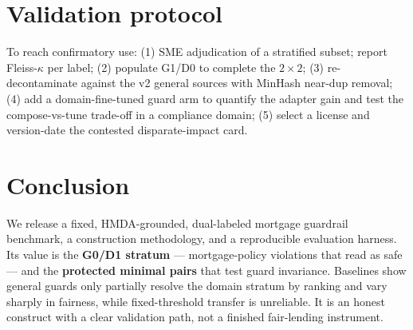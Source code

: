 \documentclass[11pt]{article}
\begin{document}
\section{Validation protocol}
\label{sec:protocol}
To reach confirmatory use: (1) SME adjudication of a stratified subset; report Fleiss-$\kappa$ per
label; (2) populate G1/D0 to complete the $2\times2$; (3) re-decontaminate against the v2 general
sources with MinHash near-dup removal; (4) add a domain-fine-tuned guard arm to quantify the adapter
gain and test the compose-vs-tune trade-off in a compliance domain; (5) select a license and
version-date the contested disparate-impact card.

\section{Conclusion}
\label{sec:conclusion}
We release a fixed, HMDA-grounded, dual-labeled mortgage guardrail benchmark, a construction
methodology, and a reproducible evaluation harness. Its value is the \textbf{G0/D1 stratum} ---
mortgage-policy violations that read as safe --- and the \textbf{protected minimal pairs} that test
guard invariance. Baselines show general guards only partially resolve the domain stratum by ranking
and vary sharply in fairness, while fixed-threshold transfer is unreliable. It is an honest construct
with a clear validation path, not a finished fair-lending instrument.



\end{document}
